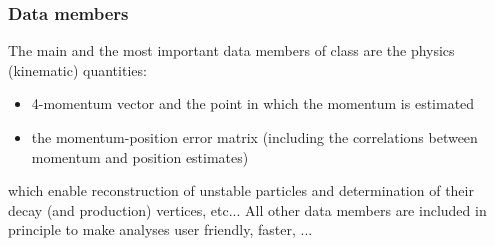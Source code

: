 \subsubsection{Data members}

The main and the most important data members of \particle class are the physics (kinematic) quantities:
\begin{itemize}
 \item 4-momentum vector and the point in which the momentum is estimated 
 \item the momentum-position error matrix (including the correlations between momentum and position estimates)
\end{itemize}
which enable reconstruction of unstable particles and determination of their decay (and production) vertices, etc... All other data members
are included in principle to make analyses user friendly, faster, ...

